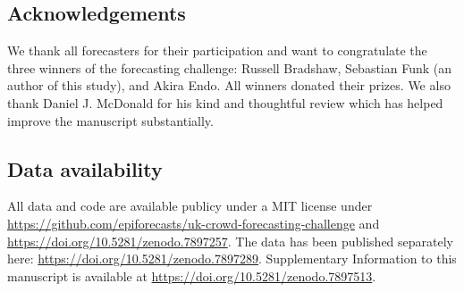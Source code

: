 \documentclass[10pt,a4paper,twocolumn]{article}
\begin{document}
\subsection*{Acknowledgements}
We thank all forecasters for their participation and want to congratulate the three winners of the forecasting challenge: Russell Bradshaw, Sebastian Funk (an author of this study), and Akira Endo. All winners donated their prizes. We also thank Daniel J. McDonald for his kind and thoughtful review which has helped improve the manuscript substantially. 


\subsection*{Data availability}
All data and code are available publicy under a MIT license under \url{https://github.com/epiforecasts/uk-crowd-forecasting-challenge} and \url{https://doi.org/10.5281/zenodo.7897257}. The data has been published separately here: \url{https://doi.org/10.5281/zenodo.7897289}. 
Supplementary Information \cite{bosseSupplementaryInformationHuman2023} to this manuscript is available at \url{https://doi.org/10.5281/zenodo.7897513}. 


\clearpage
{\small
}







\end{document}
